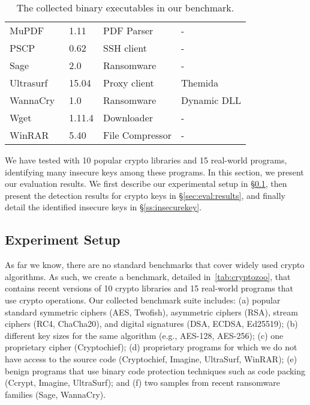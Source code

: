 \begin{table}[t]
\begin{tabular}{p{2cm} p{0.8cm} p{2.1cm} p{1.5cm} }
{MuPDF~\cite{mupdf_cryptozoo}}				& {1.11}			& {PDF Parser}				& - \\
{PSCP~\cite{putty_cryptozoo}}			& {0.62}			& {SSH client}				& - \\
{Sage~\cite{sage_cryptozoo}}				& {2.0}				& {Ransomware}				& - \\
{Ultrasurf~\cite{ultrasurf_cryptozoo}}		& {15.04}			& {Proxy client}			& Themida \\
{WannaCry~\cite{wannacry_cryptozoo}}		& {1.0}				& {Ransomware}				& Dynamic DLL \\
{Wget~\cite{wget_cryptozoo}}				& {1.11.4}			& {Downloader}				& - \\
{WinRAR~\cite{winrar_cryptozoo}}			& {5.40}			& {File Compressor}			& - \\
\bottomrule
\end{tabular}
\vspace{0.1cm}
\caption{The collected binary executables in our benchmark.}\label{tab:cryptozoo}
\end{table}


    
    
We have tested \sysname with {10 popular crypto libraries and 15 real-world programs}, identifying many insecure keys among these programs. In this section, we present our evaluation results. We first describe our experimental setup in \S\ref{sec:eval:setting}, then present the detection results for crypto keys in \S\ref{sec:eval:results}, and finally detail the identified insecure keys in \S\ref{ss:insecurekey}. 

\subsection{Experiment Setup}\label{sec:eval:setting}

As far we know, there are no standard benchmarks that cover widely used crypto algorithms. 
As such, we create a benchmark, detailed in~\autoref{tab:cryptozoo}, that contains recent versions of 10 crypto libraries and 15 real-world programs that use crypto operations. 
Our collected benchmark suite includes:
(a) popular standard symmetric ciphers (AES, Twofish), asymmetric ciphers (RSA), stream ciphers (RC4, ChaCha20), and digital signatures (DSA, ECDSA, Ed25519);
(b) different key sizes for the same algorithm (e.g., AES-128, AES-256); 
(c) one proprietary cipher (Cryptochief); 
(d) proprietary programs for which we do not have access to the source code (Cryptochief, Imagine,  UltraSurf, WinRAR); 
(e) benign programs that use binary code protection techniques such as code packing (Ccrypt, Imagine, UltraSurf); and 
(f) two samples from recent ransomware families (Sage, WannaCry).


